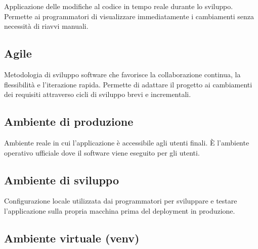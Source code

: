 \documentclass[a4paper, 11pt, oneside]{scrartcl} %
\begin{document}

Applicazione delle modifiche al codice in tempo reale durante lo sviluppo. Permette ai programmatori di visualizzare immediatamente i cambiamenti senza necessità di riavvi manuali.

\vspace{0.5cm}

\subsection*{Agile}


Metodologia di sviluppo software che favorisce la collaborazione continua, la flessibilità e l'iterazione rapida. Permette di adattare il progetto ai cambiamenti dei requisiti attraverso cicli di sviluppo brevi e incrementali.

\vspace{0.5cm}

\subsection*{Ambiente di produzione}


Ambiente reale in cui l'applicazione è accessibile agli utenti finali. È l'ambiente operativo ufficiale dove il software viene eseguito per gli utenti.

\vspace{0.5cm}

\subsection*{Ambiente di sviluppo}


Configurazione locale utilizzata dai programmatori per sviluppare e testare l'applicazione sulla propria macchina prima del deployment in produzione.

\vspace{0.5cm}

\subsection*{Ambiente virtuale (venv)}

\end{document}
